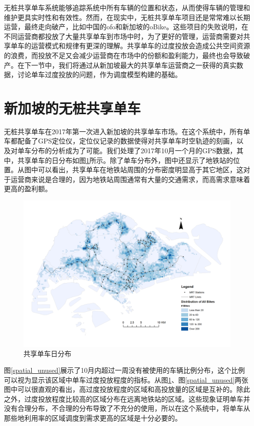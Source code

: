 \documentclass[]{tongjithesis}
\numberwithin{equation}{chapter}
\begin{document}
无桩共享单车系统能够追踪系统中所有车辆的位置和状态，从而使得车辆的管理和维护更具实时性和有效性。然而，在现实中，无桩共享单车项目还是常常难以长期运营，最终走向破产，比如中国的ofo和新加坡的oBike。这些项目的失败说明，在不同运营商都投放了大量共享单车到市场中时，为了更好的管理，运营商需要对共享单车的运营模式和规律有更深的理解。共享单车的过度投放会造成公共空间资源的浪费，而投放不足又会减少运营商在市场中的份额和盈利能力，最终也会导致破产。在下一节中，我们将通过从新加坡最大的共享单车运营商之一获得的真实数据，讨论单车过度投放的问题，作为调度模型构建的基础。



\section{新加坡的无桩共享单车}
无桩共享单车在2017年第一次进入新加坡的共享单车市场。在这个系统中，所有单车都配备了GPS定位仪，定位仪记录的数据使得对共享单车时空轨迹的刻画，以及对单车分布的分析成为了可能。我们处理了2017年10月一个月的GPS数据，其中，共享单车的日分布如图\ref{spatial_aday}所示。除了单车分布外，图中还显示了地铁站的位置。从图中可以看出，共享单车在地铁站周围的分布密度明显高于其它地区，这对于运营商来说是合理的，因为地铁站周围通常有大量的交通需求，而高需求意味着更高的盈利额。

\begin{figure}[H]
	\centering
	\includegraphics[width= 0.9 \textwidth]{figures_main/spatial_distribution_aday.png}
	\caption{共享单车日分布}
	\label{spatial_aday}
\end{figure}

图\ref{spatial_unused}展示了10月内超过一周没有被使用的车辆比例分布，这个比例可以视为显示该区域中单车过度投放程度的指标。从图\ref{spatial_aday}、图\ref{spatial_unused}两张图中可以很直观的看出，高过度投放程度的区域和高投放量的区域是互补的。除此之外，过度投放程度比较高的区域分布在远离地铁站的区域。这些现象证明单车并没有合理分布，不合理的分布导致了不充分的使用，所以在这个系统中，将单车从那些地利用率的区域调度到需求更高的区域是十分必要的。
\end{document}
